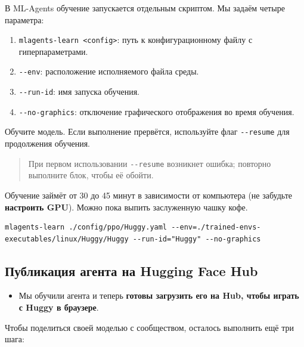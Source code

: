 \documentclass[11pt,a4paper]{article}
\begin{document}

В ML-Agents обучение запускается отдельным скриптом. Мы задаём четыре параметра:

\begin{enumerate}
\def\labelenumi{\arabic{enumi}.}
\tightlist
\item
  \texttt{mlagents-learn\ \textless{}config\textgreater{}}: путь к конфигурационному файлу с гиперпараметрами.
\item
  \texttt{-\/-env}: расположение исполняемого файла среды.
\item
  \texttt{-\/-run-id}: имя запуска обучения.
\item
  \texttt{-\/-no-graphics}: отключение графического отображения во время обучения.
\end{enumerate}

Обучите модель. Если выполнение прервётся, используйте флаг \texttt{-\/-resume} для продолжения обучения.

\begin{quote}
При первом использовании \texttt{-\/-resume} возникнет ошибка; повторно выполните блок, чтобы её обойти.
\end{quote}

Обучение займёт от 30 до 45 минут в зависимости от компьютера (не забудьте \textbf{настроить GPU}). Можно пока выпить заслуженную чашку кофе.

\begin{lstlisting}
mlagents-learn ./config/ppo/Huggy.yaml --env=./trained-envs-executables/linux/Huggy/Huggy --run-id="Huggy" --no-graphics
\end{lstlisting}

\subsection{Публикация агента на Hugging Face Hub}\label{push-the-agent-to-the-hub}

\begin{itemize}
\tightlist
\item
Мы обучили агента и теперь \textbf{готовы загрузить его на Hub, чтобы играть с Huggy в браузере}.
\end{itemize}

Чтобы поделиться своей моделью с сообществом, осталось выполнить ещё три шага:
\end{document}
